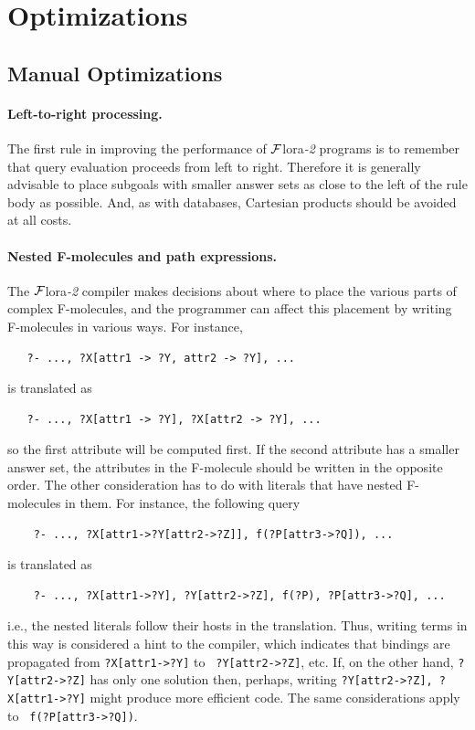 \documentclass[11pt]{article}
\newcommand{\FLORA}{{\mbox{\sc ${\cal F}${lora}\rm\emph{-2}}}\xspace}
\begin{document}
\section{Optimizations}

\subsection{Manual Optimizations}

\paragraph{Left-to-right processing.}
The first rule in improving the performance of \FLORA programs is to
remember that query evaluation proceeds from left to right. Therefore it is
generally advisable to place subgoals with smaller answer sets as close to
the left of the rule body as possible. And, as with databases, Cartesian
products should be avoided at all costs.

\paragraph{Nested F-molecules and path expressions.}
The \FLORA compiler makes decisions about
where to place the various parts of complex F-molecules, and the
programmer can affect this placement by writing F-molecules in various ways.
For instance,
\begin{verbatim}
   ?- ..., ?X[attr1 -> ?Y, attr2 -> ?Y], ...
\end{verbatim}
is translated as
\begin{verbatim}
   ?- ..., ?X[attr1 -> ?Y], ?X[attr2 -> ?Y], ...  
\end{verbatim}
so the first attribute will be computed first. If the second attribute has
a smaller answer set, the attributes in the F-molecule should be written in
the opposite order. The other consideration has to do with literals that
have nested F-molecules in them. For instance, the following query
\begin{verbatim}
    ?- ..., ?X[attr1->?Y[attr2->?Z]], f(?P[attr3->?Q]), ...
\end{verbatim}
is translated as
\begin{verbatim}
    ?- ..., ?X[attr1->?Y], ?Y[attr2->?Z], f(?P), ?P[attr3->?Q], ...
\end{verbatim}
i.e., the nested literals follow their hosts in the translation.
Thus, writing terms in this way is considered a hint to the compiler, which
indicates that bindings are propagated from {\tt ?X[attr1->?Y]} to {\tt
  ?Y[attr2->?Z]}, etc. If, on the other hand, {\tt ?Y[attr2->?Z]} has only one
solution then, perhaps, writing {\tt ?Y[attr2->?Z], ?X[attr1->?Y]} might
produce more efficient code.  The same considerations apply to {\tt
  f(?P[attr3->?Q])}.
\end{document}
